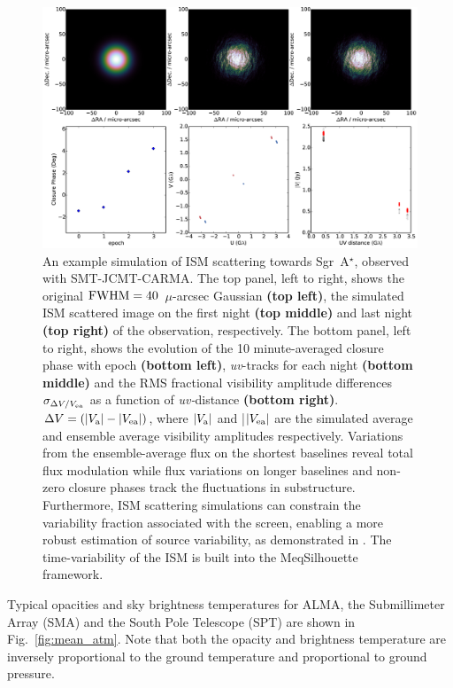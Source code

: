 \begin{figure}
\begin{center}
\includegraphics[width=1.8\columnwidth]{Images/ism}
\caption{An example simulation of ISM scattering towards Sgr~A$^{\star}$, observed with SMT-JCMT-CARMA.  The top panel, left to right, shows the original $\rm FWHM = 40$~$\mu$-arcsec Gaussian {\bf (top left)}, the simulated ISM scattered image on the first night {\bf (top middle)} and last night {\bf (top right)} of the observation, respectively.  The bottom panel, left to right,  shows the evolution of the 10 minute-averaged closure phase with epoch {\bf (bottom left)}, {\sl uv}-tracks for each night {\bf (bottom middle)} and the RMS fractional visibility amplitude differences $\sigma_{\Delta V /V_{\rm ea}}$ as a function of {\sl uv-}distance {\bf (bottom right)}. $ \Delta V= (|V_{\rm a}|-|V_{\rm ea}|)$, where $|V_{\rm a}|$ and |$|V_{\rm ea}|$ are the simulated average and ensemble average visibility amplitudes respectively. Variations from the ensemble-average flux on the shortest baselines reveal total flux modulation while flux variations on longer baselines and non-zero closure phases track the fluctuations in substructure.  Furthermore, ISM scattering simulations can constrain the variability fraction associated with the screen, enabling a more robust estimation of source variability, as demonstrated in \citet{2016arXiv160106571O}. The time-variability of the ISM is built into the {\sc MeqSilhouette} framework.\label{ISM_sequence}%
}
\end{center}
\end{figure}

Typical opacities and sky brightness temperatures for ALMA, the Submillimeter Array (SMA) and the South Pole Telescope (SPT)  are shown in Fig.~\ref{fig:mean_atm}.  Note that both the opacity and brightness temperature are inversely proportional to the ground temperature and proportional to ground pressure.

